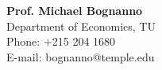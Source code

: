 \documentclass[12pt,letterpaper]{article}
\begin{document}
\begin{multicols}{2}
	
	\vspace{.2in}
	\textbf{Prof. Michael Bognanno} \\
	Department of Economics, TU \\
	\hfill {Phone: +215 204 1680}\\
	\hfill{E-mail: {\color{blue}bognanno@temple.edu}}\\	
%	
\end{multicols}
\end{document}
